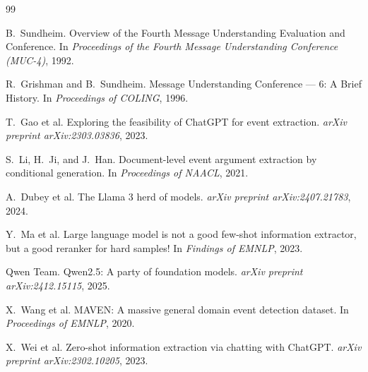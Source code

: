 \documentclass[11pt,a4paper]{article}
\begin{document}

\begin{thebibliography}{99}

B.\ Sundheim.
\newblock Overview of the Fourth Message Understanding Evaluation and Conference.
\newblock In \textit{Proceedings of the Fourth Message Understanding Conference (MUC-4)}, 1992.

R.\ Grishman and B.\ Sundheim.
\newblock Message Understanding Conference — 6: A Brief History.
\newblock In \textit{Proceedings of COLING}, 1996.

T.\ Gao et al.
\newblock Exploring the feasibility of ChatGPT for event extraction.
\newblock \textit{arXiv preprint arXiv:2303.03836}, 2023.

S.\ Li, H.\ Ji, and J.\ Han.
\newblock Document-level event argument extraction by conditional generation.
\newblock In \textit{Proceedings of NAACL}, 2021.

A.\ Dubey et al.
\newblock The Llama 3 herd of models.
\newblock \textit{arXiv preprint arXiv:2407.21783}, 2024.

Y.\ Ma et al.
\newblock Large language model is not a good few-shot information extractor, but a good reranker for hard samples!
\newblock In \textit{Findings of EMNLP}, 2023.

Qwen Team.
\newblock Qwen2.5: A party of foundation models.
\newblock \textit{arXiv preprint arXiv:2412.15115}, 2025.

X.\ Wang et al.
\newblock MAVEN: A massive general domain event detection dataset.
\newblock In \textit{Proceedings of EMNLP}, 2020.

X.\ Wei et al.
\newblock Zero-shot information extraction via chatting with ChatGPT.
\newblock \textit{arXiv preprint arXiv:2302.10205}, 2023.

\end{thebibliography}
\end{document}
